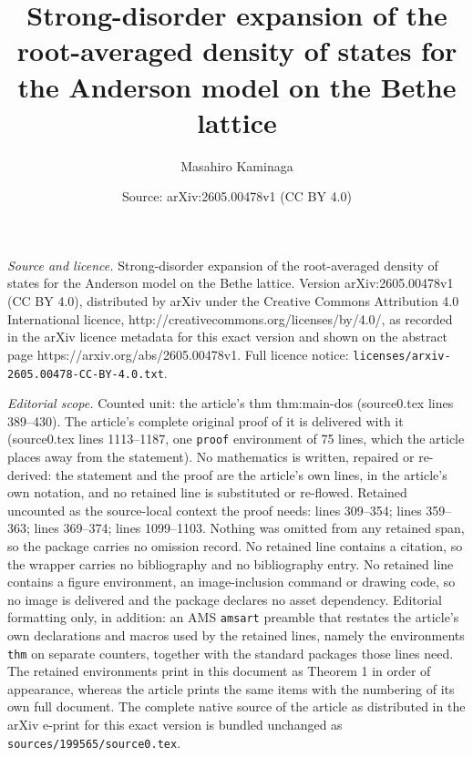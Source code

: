 \documentclass[10pt,a4paper]{amsart}
\title{Strong-disorder expansion of the root-averaged density of states for the Anderson model on the Bethe lattice}
\author{Masahiro Kaminaga}
\date{Source: arXiv:2605.00478v1 (CC BY 4.0)}
\begin{document}
\maketitle

\noindent\emph{Source and licence.} Strong-disorder expansion of the root-averaged density of states for the Anderson model on the Bethe lattice. Version arXiv:2605.00478v1 (CC BY 4.0), distributed by arXiv under the Creative Commons Attribution 4.0 International licence, http://creativecommons.org/licenses/by/4.0/, as recorded in the arXiv licence metadata for this exact version and shown on the abstract page https://arxiv.org/abs/2605.00478v1. Full licence notice: \texttt{licenses/arxiv-2605.00478-CC-BY-4.0.txt}.\par\smallskip

\noindent\textit{Editorial scope.} Counted unit: the article's thm thm:main-dos (source0.tex lines 389--430). The article's complete original proof of it is delivered with it (source0.tex lines 1113--1187, one \texttt{proof} environment of 75 lines, which the article places away from the statement). No mathematics is written, repaired or re-derived: the statement and the proof are the article's own lines, in the article's own notation, and no retained line is substituted or re-flowed.  Retained uncounted as the source-local context the proof needs: lines 309--354; lines 359--363; lines 369--374; lines 1099--1103.  Nothing was omitted from any retained span, so the package carries no omission record.  No retained line contains a citation, so the wrapper carries no bibliography and no bibliography entry.  No retained line contains a figure environment, an image-inclusion command or drawing code, so no image is delivered and the package declares no asset dependency.  Editorial formatting only, in addition: an AMS \texttt{amsart} preamble that restates the article's own declarations and macros used by the retained lines, namely the environments \texttt{thm} on separate counters, together with the standard packages those lines need.  The retained environments print in this document as Theorem 1 in order of appearance, whereas the article prints the same items with the numbering of its own full document.  The complete native source of the article as distributed in the arXiv e-print for this exact version is bundled unchanged as \texttt{sources/199565/source0.tex}.
\end{document}

